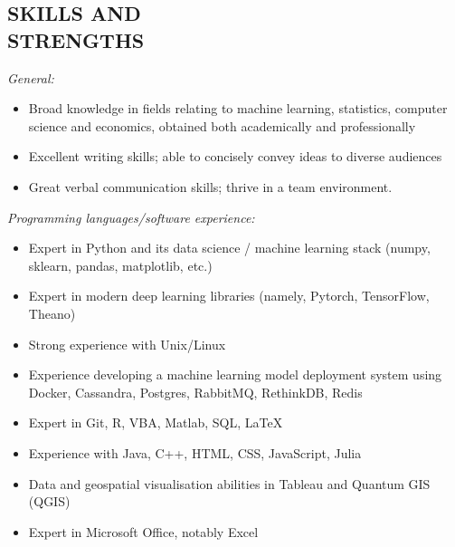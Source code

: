 \documentclass[margin]{res}
\begin{document}
\begin{resume}
		\section{SKILLS AND \\ STRENGTHS}
		{\it General:}\vspace{3mm}
		\begin{itemize}
			\item Broad knowledge in fields relating to machine learning, statistics, computer science and economics, obtained both academically and professionally
			\item Excellent writing skills; able to concisely convey ideas to diverse audiences
			\item Great verbal communication skills; thrive in a team environment.
		\end{itemize}
		{\it Programming languages/software experience:}\vspace{3mm}
		\begin{itemize}
			\item Expert in Python and its data science / machine learning stack (numpy, sklearn, pandas, matplotlib, etc.)
			\item Expert in modern deep learning libraries (namely, Pytorch, TensorFlow, Theano)
			\item Strong experience with Unix/Linux
			\item Experience developing a machine learning model deployment system using Docker, Cassandra, Postgres, RabbitMQ, RethinkDB, Redis
			\item Expert in Git, R, VBA, Matlab, SQL, \LaTeX
			\item Experience with Java, C++, HTML, CSS, JavaScript, Julia
			\item Data and geospatial visualisation abilities in Tableau and Quantum GIS (QGIS)
			\item Expert in Microsoft Office, notably Excel
		\end{itemize}
		
	\end{resume}
	
\end{document}
